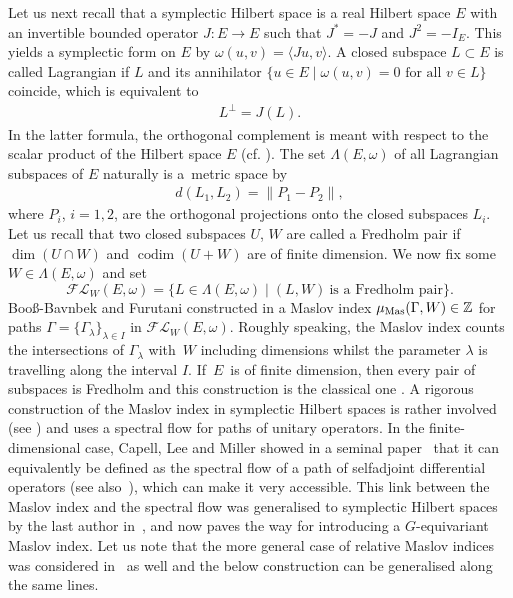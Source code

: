 \documentclass[pdftex]{sigma}
\numberwithin{equation}{section}
\theoremstyle{definition}
\DeclareMathOperator{\codim}{codim}
\begin{document}
Let us next recall that a symplectic Hilbert space is a real Hilbert space $E$ with an invertible bounded operator $J \colon E\rightarrow E$ such that $J^\ast=-J$ and $J^2=-I_E$. This yields a symplectic form on $E$ by $\omega(u,v)=\langle Ju,v\rangle$. A closed subspace $L\subset E$ is called Lagrangian if $L$ and its annihilator $\{u\in E \mid \omega(u,v)=0\,\,\text{for all}\,\, v\in L\}$ coincide, which is equivalent to
\begin{align}\label{Lag}
L^\perp=J(L).
\end{align}
In the latter formula, the orthogonal complement is meant with respect to the scalar product of the Hilbert space $E$ (cf. \cite{Furutani}). The set $\Lambda(E,\omega)$ of all Lagrangian subspaces of $E$ naturally is a~metric space by
\begin{align}\label{gapII}
d(L_1,L_2)=\|P_1-P_2\|,
\end{align}
where $P_i$, $i=1,2$, are the orthogonal projections onto the closed subspaces $L_i$. Let us recall that two closed subspaces $U$, $W$ are called a Fredholm pair if $\dim(U\cap W)$ and $\codim(U+W)$ are of finite dimension. We now fix some $W\in\Lambda(E,\omega)$ and set
\[\mathcal{FL}_W(E,\omega)=\{L\in \Lambda(E,\omega) \mid (L,W) \ \text{is a Fredholm pair}\}.\]
Boo{\ss}-Bavnbek and Furutani constructed in \cite{Bernhelm} a Maslov index $\mu_{\rm Mas}(\Gamma,W)\in\mathbb{Z}$ for paths $\Gamma=\{\Gamma_\lambda\}_{\lambda\in I}$ in $\mathcal{FL}_W(E,\omega)$. Roughly speaking, the Maslov index counts the intersections of $\Gamma_\lambda$ with~$W$ including dimensions whilst the parameter $\lambda$ is travelling along the interval $I$. If~$E$~is of finite dimension, then every pair of subspaces is Fredholm and this construction is the classical one \cite{Robbin-SalamonMAS}. A rigorous construction of the Maslov index in symplectic Hilbert spaces is rather involved (see \cite{Furutani}) and uses a spectral flow for paths of unitary operators. In the finite-dimensional case, Capell, Lee and Miller showed in a seminal paper~\cite{Cappell} that it can equivalently be defined as the spectral flow of a path of selfadjoint differential operators (see also~\cite{IJW}), which can make it very accessible. This link between the Maslov index and the spectral flow was generalised to symplectic Hilbert spaces by the last author in~\cite{ODE}, and now paves the way for introducing a $G$-equivariant Maslov index. Let us note that the more general case of relative Maslov indices was considered in~\cite{Furutani} as well and the below construction can be generalised along the same lines.
\end{document}
